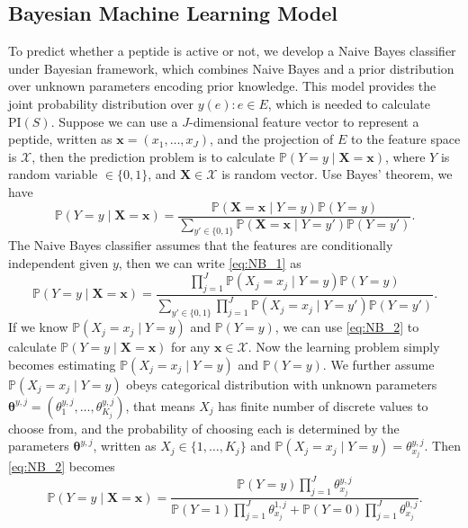 \documentclass[11pt]{article}
\newcommand{\Prob}{\mathbb{P}}
\newcommand{\PI}{\text{PI}}
\begin{document}
\subsection{Bayesian Machine Learning Model} \label{sec:stat model}

To predict whether a peptide is active or not, we develop a Naive Bayes classifier under Bayesian framework, which combines Naive Bayes and a prior distribution over unknown parameters encoding prior knowledge. This model provides the joint probability distribution over $y(e): e \in E$, which is needed to calculate $\PI(S)$. Suppose we can use a $J$-dimensional feature vector to represent a peptide, written as $\bm{x} = (x_1, \ldots, x_J)$, and the projection of $E$ to the feature space is $\mathcal{X}$, then the prediction problem is to calculate $\Prob (Y = y \mid \bm{X} = \bm{x})$, where $Y$ is random variable $\in \{0, 1\}$,
and $\bm{X} \in \mathcal{X}$ is random vector. Use Bayes' theorem, we have
\begin{equation}
  \Prob(Y = y \mid \bm{X} = \bm{x}) = \frac{\Prob(\bm{X} = \bm{x} \mid Y = y) \Prob(Y = y)}{\sum_{y' \in \{0, 1\}} \Prob(\bm{X}= \bm{x} \mid Y = y') \Prob(Y = y')}.
  \label{eq:NB_1}
\end{equation}
The Naive Bayes classifier assumes that the features are conditionally independent given $y$, then we can write \eqref{eq:NB_1} as 
\begin{equation}
  \Prob(Y = y \mid \bm{X} = \bm{x}) = \frac{\prod_{j = 1}^J \Prob(X_j = x_j \mid Y = y) \Prob(Y = y)}{\sum_{y' \in \{0, 1\}} \prod_{j = 1}^J \Prob(X_j = x_j \mid Y = y') \Prob(Y = y')}.
  \label{eq:NB_2}
\end{equation}
If we know $\Prob(X_j = x_j \mid Y = y)$ and $\Prob(Y = y)$, we can use \eqref{eq:NB_2} to calculate $\Prob(Y = y \mid \bm{X} = \bm{x})$ for any $\bm{x} \in \mathcal{X}$. Now the learning problem simply becomes estimating $\Prob(X_j = x_j \mid Y = y)$ and $\Prob(Y = y)$. We further assume $\Prob(X_j = x_j \mid Y = y)$ obeys categorical distribution with unknown parameters $\bm{\theta}^{y, j} = (\theta^{y, j}_1, \ldots, \theta^{y, j}_{K_j})$, that means $X_j$ has finite number of discrete values to choose from, and the probability of choosing each is determined by the parameters $\bm{\theta}^{y, j}$, written as $X_j \in \{1, \ldots, K_j\}$ and $\Prob(X_j = x_j \mid Y = y) = \theta^{y, j}_{x_j}$. Then \eqref{eq:NB_2} becomes
\begin{equation}
  \Prob (Y = y \mid \bm{X} = \bm{x}) = \frac{\Prob(Y = y) \prod_{j=1}^J \theta^{y, j}_{x_j}}
  {\Prob(Y = 1) \prod_{j=1}^J \theta^{1,j}_{x_j} + \Prob(Y = 0) \prod_{j=1}^J \theta^{0,j}_{x_j}}.
  \label{eq:NB_3}
\end{equation}
\end{document}
